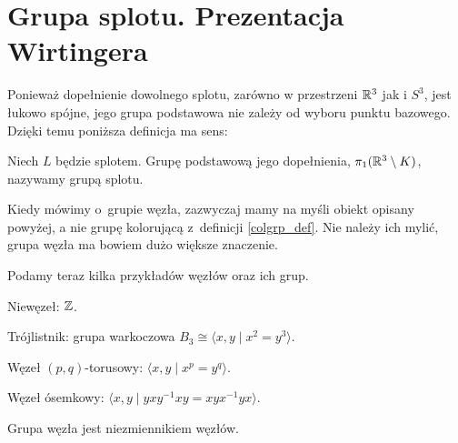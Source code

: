 \section{Grupa splotu. Prezentacja Wirtingera} %
\label{sec:group_wirtinger}

Ponieważ dopełnienie dowolnego splotu, zarówno w przestrzeni $\mathbb R^3$ jak i $S^3$, jest łukowo spójne, jego grupa podstawowa nie zależy od wyboru punktu bazowego.
Dzięki temu poniższa definicja ma sens:

\begin{definition}
    \label{def:knot_group}
    Niech $L$ będzie splotem.
    Grupę podstawową jego dopełnienia,  $\pi_1(\mathbb R^3 \setminus K)$, nazywamy grupą splotu.
\end{definition}

Kiedy mówimy o~grupie węzła, zazwyczaj mamy na myśli obiekt opisany powyżej, a nie grupę kolorującą z~definicji \ref{colgrp_def}.
Nie należy ich mylić, grupa węzła ma bowiem dużo większe znaczenie.

Podamy teraz kilka przykładów węzłów oraz ich grup.

\begin{example}
    Niewęzeł: $\mathbb Z$.
\end{example}

\begin{example}
    Trójlistnik: grupa warkoczowa $B_3 \cong \langle x, y \mid x^2 = y^3\rangle$.
\end{example}

\begin{example}
    Węzeł $(p,q)$-torusowy: $\langle x, y \mid x^p = y^q \rangle$.
\end{example}

\begin{example}
    Węzeł ósemkowy: $\langle x, y \mid yxy^{{-1}}xy=xyx^{{-1}}yx \rangle$.
\end{example}


\begin{proposition}
    \label{prop:knot_group_invariant}
    Grupa węzła jest niezmiennikiem węzłów.
\end{proposition}

